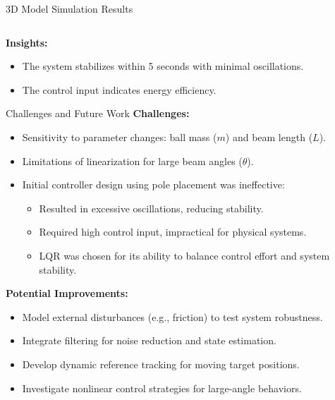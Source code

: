 \documentclass{beamer}
\begin{document}
\begin{frame}{3D Model Simulation Results}
\begin{columns}[T]
\begin{column}{0.48\textwidth}
\begin{itemize}
            \end{itemize}
        \end{column}
    \end{columns}
    \begin{flushleft}
    \textbf{\small Insights:}
    \begin{itemize}
	\footnotesize
        \item The system stabilizes within 5 seconds with minimal oscillations.
        \item The control input indicates energy efficiency.
    \end{itemize}
	\end{flushleft}
\end{frame}




\begin{frame}{Challenges and Future Work}
    \textbf{Challenges:}
    \begin{itemize}
        \item Sensitivity to parameter changes: ball mass (\(m\)) and beam length (\(L\)).
        \item Limitations of linearization for large beam angles (\(\theta\)).
        \item Initial controller design using pole placement was ineffective:
        \begin{itemize}
            \footnotesize
            \item Resulted in excessive oscillations, reducing stability.
            \item Required high control input, impractical for physical systems.
            \item LQR was chosen for its ability to balance control effort and system stability.
        \end{itemize}
    \end{itemize}

    \vspace{0.2cm}
    \textbf{Potential Improvements:}
    \begin{itemize}
        \item Model external disturbances (e.g., friction) to test system robustness.
        \item Integrate filtering for noise reduction and state estimation.
        \item Develop dynamic reference tracking for moving target positions.
        \item Investigate nonlinear control strategies for large-angle behaviors.
    \end{itemize}
\end{frame}
\end{document}
